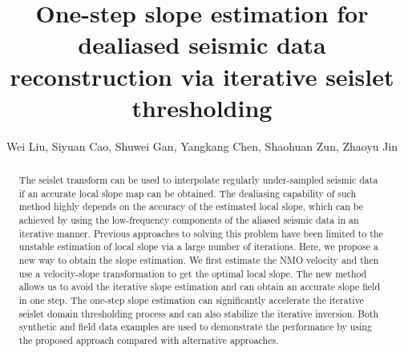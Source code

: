   
\title{One-step slope estimation for dealiased seismic data reconstruction via iterative seislet thresholding}
\renewcommand{\thefootnote}{\fnsymbol{footnote}}

\author{Wei Liu\footnotemark[1], Siyuan Cao\footnotemark[1], Shuwei Gan\footnotemark[1], Yangkang Chen\footnotemark[2], Shaohuan Zun\footnotemark[1], Zhaoyu Jin\footnotemark[3]}
\address{
\footnotemark[1]
State Key Laboratory of Petroleum Resources and Prospecting, 
China University of Petroleum, 
Fuxue Road 18th,
Beijing, China, 102200, 
Email: liuwei\_upc@126.com \& csy@cup.edu.cn \& gsw19900128@126.com \& zushaohuan@qq.com\\
\footnotemark[2] Jackson School of Geosciences,
The University of Texas at Austin,
University Station, Box X,
Austin, TX 78713-8924, USA,
Email: ykchen@utexas.edu\\
\footnotemark[3]School of Geosciences,
University of Edinburgh,
Edinburgh,UK, EH9 3JW,
Email: s1263999@sms.ed.ac.uk
}

\maketitle

\begin{abstract}
The seislet transform can be used to interpolate regularly under-sampled seismic data if an accurate local slope map can be obtained. The dealiasing capability of such method highly depends on the accuracy of the estimated local slope, which can be achieved by using the low-frequency components of the aliased seismic data in an iterative manner. Previous approaches to solving this problem have been limited to the unstable estimation of local slope via a large number of iterations. Here, we propose a new way to obtain the slope estimation. We first estimate the NMO velocity and then use a velocity-slope transformation to get the optimal local slope. The new method allows us to avoid the iterative slope estimation and can obtain an accurate slope field in one step. The one-step slope estimation can significantly accelerate the iterative seislet domain thresholding process and can also stabilize the iterative inversion. Both synthetic and field data examples are used to demonstrate the performance by using the proposed approach compared with alternative approaches. 
\end{abstract}

